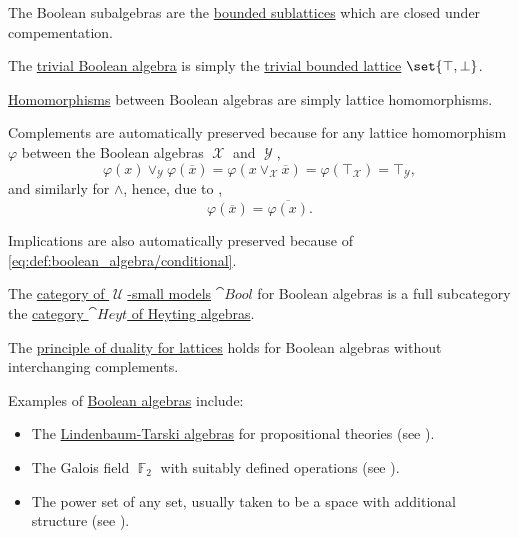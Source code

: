 \begin{definition}
\begin{thmenum}[resume=def:boolean_algebra]
     The Boolean subalgebras are the \hyperref[def:semilattice/submodel]{bounded sublattices} which are closed under compementation.

     The \hyperref[thm:substructures_form_complete_lattice/bottom]{trivial Boolean algebra} is simply the \hyperref[def:semilattice/trivial]{trivial bounded lattice} \( \set{ \top, \bot } \).

     \hyperref[def:first_order_homomorphism]{Homomorphisms} between Boolean algebras are simply lattice homomorphisms.

    Complements are automatically preserved because for any lattice homomorphism \( \varphi \) between the Boolean algebras \( \mscrX \) and \( \mscrY \),
    \begin{equation*}
      \varphi(x) \vee_\mscrY \varphi(\overline x) = \varphi(x \vee_\mscrX \overline x) = \varphi(\top_\mscrX) = \top_\mscrY,
    \end{equation*}
    and similarly for \( \wedge \), hence, due to ,
    \begin{equation*}
      \varphi(\overline x) = \overline {\varphi(x)}.
    \end{equation*}

    Implications are also automatically preserved because of \eqref{eq:def:boolean_algebra/conditional}.

     The \hyperref[def:category_of_small_first_order_models]{category of \( \mscrU \)-small models} \( \cat{Bool} \) for Boolean algebras is a full subcategory the \hyperref[def:heyting_algebra/category]{category \( \cat{Heyt} \) of Heyting algebras}.

     The \hyperref[def:semilattice/lattice_duality]{principle of duality for lattices} holds for Boolean algebras without interchanging complements.
  \end{thmenum}
\end{definition}

\begin{example}\label{ex:boolean_algebras}
  Examples of \hyperref[def:boolean_algebra]{Boolean algebras} include:

  \begin{itemize}
    \item The \hyperref[def:lindenbaum_tarski_algebra]{Lindenbaum-Tarski algebras} for propositional theories (see ).
    \item The Galois field \( \BbbF_2 \) with suitably defined operations (see ).
    \item The power set of any set, usually taken to be a space with additional structure (see ).
  \end{itemize}
\end{example}

